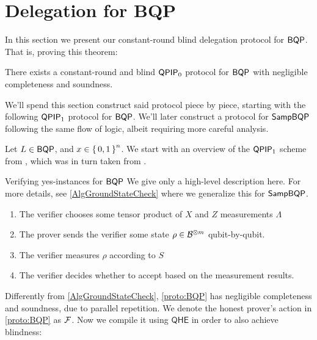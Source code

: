 \section{Delegation for BQP}
\label{sec:BlindBQP}

In this section we present our constant-round blind delegation protocol for $\operatorname{\mathsf{BQP}}$. That is, proving this theorem:
\begin{thm}
	\label{thm:QPIP0BQP}
	There exists a constant-round and blind $\operatorname{\mathsf{QPIP}}_0$ protocol for $\operatorname{\mathsf{BQP}}$ with negligible completeness and soundness.
\end{thm}
We'll spend this section construct said protocol piece by piece, starting with the following $\operatorname{\mathsf{QPIP}}_1$ protocol for $\operatorname{\mathsf{BQP}}$.
We'll later construct a protocol for $\operatorname{\mathsf{SampBQP}}$ following the same flow of logic, albeit requiring more careful analysis.

Let $L\in\operatorname{\mathsf{BQP}}$, and $x\in\set{0,1}^n$.
We start with an overview of the $\operatorname{\mathsf{QPIP}}_1$ scheme from \cite{mahadev_delegation}, which was in turn taken from \cite{mf16}.

\begin{protocol}{Verifying yes-instances for $\operatorname{\mathsf{BQP}}$}
	\label{proto:BQP}
	We give only a high-level description here.
	For more details, see \cref{AlgGroundStateCheck} where we generalize this for $\operatorname{\mathsf{SampBQP}}$.
	\begin{enumerate}
		\item The verifier chooses some tensor product of $X$ and $Z$ measurements $\Lambda$
		\item The prover sends the verifier some state $\rho\in\mathcal{B}^{\otimes m}$ qubit-by-qubit.
		\item The verifier measures $\rho$ according to $S$
		\item The verifier decides whether to accept based on the measurement results.
	\end{enumerate}
\end{protocol}

Differently from \cref{AlgGroundStateCheck}, \cref{proto:BQP} has negligible completeness and soundness, due to parallel repetition.
We denote the honest prover's action in \cref{proto:BQP} as $\mathcal{F}$.
Now we compile it using $\mathsf{QHE}$ in order to also achieve blindness:

